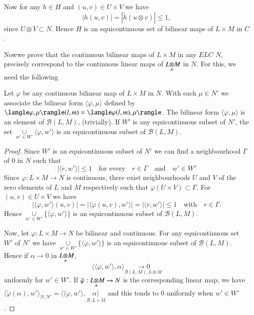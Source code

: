 Now for any $h \in H$ and $(u, v) \in U \times V$ we have 
$$
|h(u, v)| = |\tilde{h}(u \otimes v)| \leq 1,
$$
since $U\otimes V \subset N$. Hence $H$ is an equicontinuous set of
bilinear maps of $L \times M$ in $C$. 

Now\pageoriginale we prove that the continuous bilinear maps of $L \times M$ 
in any $E L C$ $N$, precisely correspond to the continuous linear maps of 
$L{\displaystyle\mathop{\otimes}_{\pi}}M$ in $N$. For this, we need the following

\begin{lemma}\label{chap12:lem12.1}
Let $\varphi$ be any continuous bilinear map of $L \times M$ in
$N$. With each $\mu \in N'$ we associate the bilinear form $\langle
\varphi, \mu \rangle$ defined by $\langle \varphi, \mu \rangle\break (l, m)
= \langle \varphi (l, m), \mu \rangle$. The bilinear form $\langle
\varphi, \mu \rangle$ is an element of $\mathscr{B}(L, M)$,
(trivially). If $W'$ is any equicontinuous subset of $N'$, the set
$\underset{w' \in W'}{\cup} \langle \varphi, w' \rangle$ is an
equicontinuous subset of $\mathscr{B}(L, M)$. 
\end{lemma}

\begin{proof}
Since $W'$ is an equicontinuous subset of $N'$ we can find a
neighbourhood $\Gamma$ of $0$ in $N$ such that 
$$
|\langle r, w'\rangle | \leq 1 \quad \text{for every} \quad r \in
\Gamma \quad \text{and} \quad w' \in W'
$$
Since $\varphi : L \times M \to N$ is continuous, there exist
neighbourhoods $U$ and $V$ of the zero elements of $L$ and $M$
respectively such that $\varphi(U \times V)\subset \Gamma$. For $(u,
v)\in U \times V$ we have
$$
|\langle \varphi, w' \rangle (u, v)|=|\langle \varphi(u, v), w'
\rangle | = | \langle r, w' \rangle | \leq 1 \quad \text{with} \quad r
\in \Gamma.
$$
Hence $\underset{w' \in W'}{\cup}\{\langle \varphi, w' \rangle \}$ is
an equicontinuous subset of $\mathscr{B}(L, M)$. 

Now, let $\varphi : L \times M \to N$ be bilinear and continuous. For
any equicontinuous set $W'$ of $N'$ we have $\underset{w' \in
  W'}{\cup}\{\langle \varphi, w' \rangle \}$ is an equicontinuous
subset of $\mathscr{B}(L, M)$. Hence if $\alpha \to 0$ in 
$L{\displaystyle\mathop{\otimes}_{\pi}}M$, 
$$
\langle \langle \varphi, w' \rangle, \alpha \rangle
\underset{\mathscr{B}(L, M), L\otimes M}{\to 0}
$$
uniformly for $w' \in W'$. If $\tilde{\varphi}:L{\displaystyle\mathop{\otimes}_{\pi}}M
\to N$ is the corresponding linear map, we have $\langle
\tilde{\varphi}(\alpha), w' \rangle_{N, N'} = \langle \langle \varphi,
w'\rangle, \underset{\mathscr{B}, L \times M}{\alpha \rangle}$ and
this tends to $0$ uniformly when $w' \in W'$. 
\end{proof}

